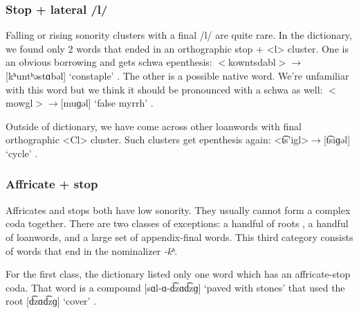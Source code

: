 	\subsubsection{Stop + lateral /l/}\label{section:syllable:Final2C:FlatRising:StopLateral}
	Falling or rising sonority clusters with a final /l/ are quite rare. In the \citeauthor{kouyoumdjian-1970-DictionaryArmenianEnglish} dictionary, we found only 2 words that ended in an orthographic stop + <l> cluster. One is an obvious borrowing and gets schwa epenthesis:  $<$kowntsdabl$>\rightarrow$[kʰuntʰəstɑbəl] `constaple'  . The other is a possible native word. We're unfamiliar with this word but we think it should be pronounced with a schwa as well: $<$mowgl$>\rightarrow$[muɡəl] `false myrrh' . 
	
	Outside of dictionary, we have come across other loanwords with final orthographic <Cl> cluster. Such clusters get epenthesis again: <t͡s'igl>$\rightarrow$[t͡siɡəl] `cycle' . 
	\subsubsection{Affricate + stop }\label{section:syllable:Final2C:FlatRising:AffrStop}
	Affricates and stops both have low sonority. They usually cannot form a complex coda together. There are two classes of exceptions: a handful of  roots , a handful of loanwords, and a large set of appendix-final words. This third category   consists of words that end in the nominalizer \textit{-kʰ}. 
	
	For the first   class, the \citeauthor{kouyoumdjian-1970-DictionaryArmenianEnglish} dictionary listed only one word  which has an affricate-stop coda. That word is a compound [sɑl-ɑ-d͡zɑd͡zɡ] `paved with stones' that used the root [d͡zɑd͡zɡ] `cover' . 
	
	
			
